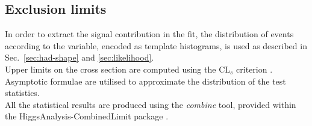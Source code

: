 



\subsection{Exclusion limits}
\label{sec:susy_results}

In order to extract the signal contribution in the fit, the distribution of events according to the \mht variable, 
encoded as template histograms, is used as described in Sec.~\ref{sec:had-shape} and \ref{sec:likelihood}. \\
Upper limits on the cross section are computed using the $\text{CL}_{s}$ criterion \cite{CLsTechnique}. 
Asymptotic formulae \cite{AsymptoticFormulae} are utilised to approximate the distribution of the test statistics. \\
All the statistical results are produced using the \textit{combine} tool, 
provided within the HiggsAnalysis-CombinedLimit package \cite{Combine}. 

